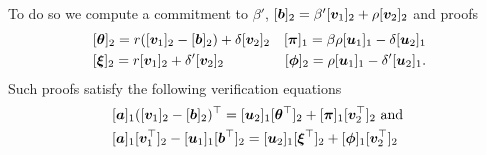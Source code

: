 To do so we compute a commitment to $\beta'$, $[{\boldsymbol{b}}]_2 = \beta'[{\boldsymbol{v}}_1]_2+\rho[{\boldsymbol{v}}_2]_2$ and proofs
\begin{align}
&[{\boldsymbol{\theta}}]_2 = r([{\boldsymbol{v}}_1]_2-[{\boldsymbol{b}}]_2)+\delta[{\boldsymbol{v}}_2]_2
&[{\boldsymbol{\pi}}]_1 = \beta\rho[{\boldsymbol{u}}_1]_1-\delta[{\boldsymbol{u}}_2]_1 \nonumber\\
&[{\boldsymbol{\xi}}]_2 = r[{\boldsymbol{v}}_1]_2+\delta'[{\boldsymbol{v}}_2]_2
&[{\boldsymbol{\phi}}]_2 = \rho[{\boldsymbol{u}}_1]_1 -\delta'[{\boldsymbol{u}}_2]_1.
\label{eq:Qm-memb-proofs}
\end{align}
Such proofs satisfy the following verification equations
\begin{align}
&[{\boldsymbol{a}}]_1([{\boldsymbol{v}}_1]_2-[{\boldsymbol{b}}]_2)^\top = [{\boldsymbol{u}}_2]_1[{\boldsymbol{\theta}}^\top]_2+[{\boldsymbol{\pi}}]_1[{\boldsymbol{v}}^\top_2]_2\text{ and } \label{eq:Qm-memb-verif1} \\
&[{\boldsymbol{a}}]_1[{\boldsymbol{v}}_1^\top]_2-[{\boldsymbol{u}}_1]_1[{\boldsymbol{b}}^\top]_2 = [{\boldsymbol{u}}_2]_1[{\boldsymbol{\xi}}^\top]_2 + [{\boldsymbol{\phi}}]_1[{\boldsymbol{v}}^\top_2]_2 \label{eq:Qm-memb-verif2}
\end{align}

